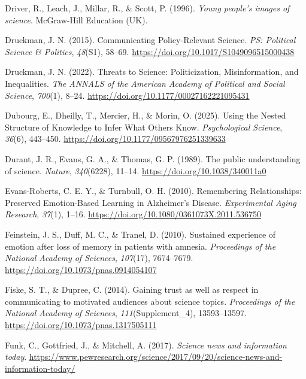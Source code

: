 \documentclass[
  jou,
  floatsintext,
  longtable,
  nolmodern,
  notxfonts,
  notimes,
  colorlinks=true,linkcolor=blue,citecolor=blue,urlcolor=blue]{apa7}
\newlength{\cslhangindent}
\newenvironment{CSLReferences}[2] %
 {\begin{list}{}{%
  \setlength{\itemindent}{0pt}
  \setlength{\leftmargin}{0pt}
  \setlength{\parsep}{0pt}
  \ifodd #1
   \setlength{\leftmargin}{\cslhangindent}
   \setlength{\itemindent}{-1\cslhangindent}
  \fi
  \setlength{\itemsep}{#2\baselineskip}}}
 {\end{list}}
\begin{document}
\begin{CSLReferences}{1}{0}
Driver, R., Leach, J., Millar, R., \& Scott, P. (1996). \emph{Young
people's images of science}. McGraw-Hill Education (UK).

Druckman, J. N. (2015). Communicating Policy-Relevant Science. \emph{PS:
Political Science \& Politics}, \emph{48}(S1), 58--69.
\url{https://doi.org/10.1017/S1049096515000438}

Druckman, J. N. (2022). Threats to Science: Politicization,
Misinformation, and Inequalities. \emph{The ANNALS of the American
Academy of Political and Social Science}, \emph{700}(1), 8--24.
\url{https://doi.org/10.1177/00027162221095431}

Dubourg, E., Dheilly, T., Mercier, H., \& Morin, O. (2025). Using the
Nested Structure of Knowledge to Infer What Others Know.
\emph{Psychological Science}, \emph{36}(6), 443--450.
\url{https://doi.org/10.1177/09567976251339633}

Durant, J. R., Evans, G. A., \& Thomas, G. P. (1989). The public
understanding of science. \emph{Nature}, \emph{340}(6228), 11--14.
\url{https://doi.org/10.1038/340011a0}

Evans-Roberts, C. E. Y., \& Turnbull, O. H. (2010). Remembering
Relationships: Preserved Emotion-Based Learning in Alzheimer's Disease.
\emph{Experimental Aging Research}, \emph{37}(1), 1--16.
\url{https://doi.org/10.1080/0361073X.2011.536750}

Feinstein, J. S., Duff, M. C., \& Tranel, D. (2010). Sustained
experience of emotion after loss of memory in patients with amnesia.
\emph{Proceedings of the National Academy of Sciences}, \emph{107}(17),
7674--7679. \url{https://doi.org/10.1073/pnas.0914054107}

Fiske, S. T., \& Dupree, C. (2014). Gaining trust as well as respect in
communicating to motivated audiences about science topics.
\emph{Proceedings of the National Academy of Sciences},
\emph{111}(Supplement{\_}4), 13593--13597.
\url{https://doi.org/10.1073/pnas.1317505111}

Funk, C., Gottfried, J., \& Mitchell, A. (2017). \emph{Science news and
information today}.
\url{https://www.pewresearch.org/science/2017/09/20/science-news-and-information-today/}


\end{CSLReferences}
\end{document}
